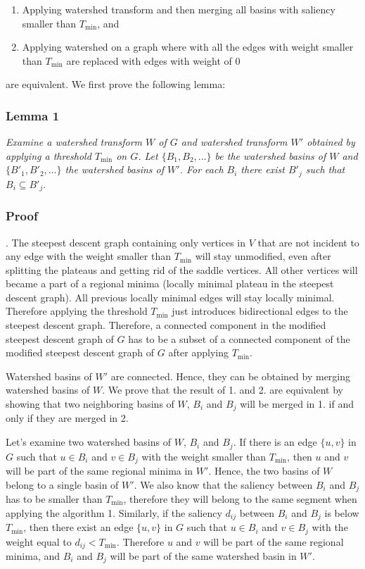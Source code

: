 \documentclass{article}\usepackage{times}
\begin{document}
\begin{enumerate}
\item Applying watershed transform and then merging all basins with
  saliency smaller than $T_{\min}$, and
\item Applying watershed on a graph where with all the edges with
  weight smaller than $T_{\min}$ are replaced with edges with weight
  of $0$
\end{enumerate}
are equivalent. We first prove the following lemma:

\subsubsection{Lemma 1}
\emph{Examine a watershed transform $W$ of $G$ and watershed transform
  $W'$ obtained by applying a threshold $T_{\min}$ on $G$. Let
  $\{B_1,B_2,\dots\}$ be the watershed basins of $W$ and
  $\{B'_1,B'_2,\dots\}$ the watershed basins of $W'$. For each $B_i$
  there exist $B'_j$ such that $B_i \subseteq B'_j$}.


\subsubsection{Proof}.
The steepest descent graph containing only vertices in $V$ that are
not incident to any edge with the weight smaller than $T_{\min}$ will
stay unmodified, even after splitting the plateaus and getting rid of
the saddle vertices. All other vertices will became a part of a
regional minima (locally minimal plateau in the steepest descent
graph). All previous locally minimal edges will stay locally
minimal. Therefore applying the threshold $T_{\min}$ just introduces
bidirectional edges to the steepest descent graph. Therefore, a
connected component in the modified steepest descent graph of $G$ has
to be a subset of a connected component of the modified steepest
descent graph of $G$ after applying $T_{\min}$.

Watershed basins of $W'$ are connected. Hence, they can be obtained by
merging watershed basins of $W$. We prove that the result of 1. and
2. are equivalent by showing that two neighboring basins of $W$, $B_i$
and $B_j$ will be merged in 1. if and only if they are merged in 2.

Let's examine two watershed basins of $W$, $B_i$ and $B_j$. If there
is an edge $\{u,v\}$ in $G$ such that $u \in B_i$ and $v \in B_j$ with
the weight smaller than $T_{\min}$, then $u$ and $v$ will be part of
the same regional minima in $W'$. Hence, the two basins of $W$ belong
to a single basin of $W'$. We also know that the saliency between
$B_i$ and $B_j$ has to be smaller than $T_{\min}$, therefore they will
belong to the same segment when applying the algorithm 1. Similarly,
if the saliency $d_{ij}$ between $B_i$ and $B_j$ is below $T_{\min}$,
then there exist an edge $\{u,v\}$ in $G$ such that $u \in B_i$ and $v
\in B_j$ with the weight equal to $d_{ij} < T_{\min}$. Therefore $u$
and $v$ will be part of the same regional minima, and $B_i$ and $B_j$
will be part of the same watershed basin in $W'$.
\end{document}
